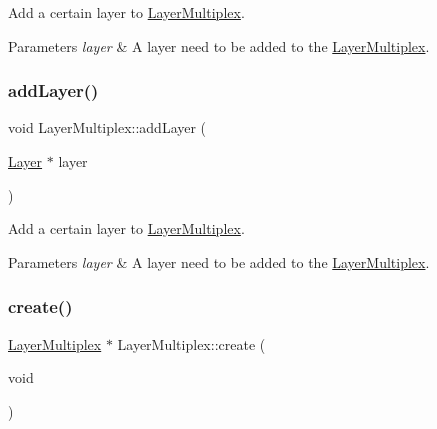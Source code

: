Add a certain layer to \hyperlink{classLayerMultiplex}{Layer\+Multiplex}.


\begin{DoxyParams}{Parameters}
{\em layer} & A layer need to be added to the \hyperlink{classLayerMultiplex}{Layer\+Multiplex}. \\
\hline
\end{DoxyParams}
\mbox{\label{classLayerMultiplex_a346cf395698a492b89e76f49cb8bc599}} 
\subsubsection{\texorpdfstring{add\+Layer()}{addLayer()}\hspace{0.1cm}{\footnotesize\ttfamily [2/2]}}
{\footnotesize\ttfamily void Layer\+Multiplex\+::add\+Layer (\begin{DoxyParamCaption}\item[{\hyperlink{classLayer}{Layer} $\ast$}]{layer }\end{DoxyParamCaption})}

Add a certain layer to \hyperlink{classLayerMultiplex}{Layer\+Multiplex}.


\begin{DoxyParams}{Parameters}
{\em layer} & A layer need to be added to the \hyperlink{classLayerMultiplex}{Layer\+Multiplex}. \\
\hline
\end{DoxyParams}
\mbox{\label{classLayerMultiplex_ab95b14187c4219ab1052b8708052dfdc}} 
\subsubsection{\texorpdfstring{create()}{create()}\hspace{0.1cm}{\footnotesize\ttfamily [1/2]}}
{\footnotesize\ttfamily \hyperlink{classLayerMultiplex}{Layer\+Multiplex} $\ast$ Layer\+Multiplex\+::create (\begin{DoxyParamCaption}\item[{void}]{ }\end{DoxyParamCaption})\hspace{0.3cm}{\ttfamily [static]}}

